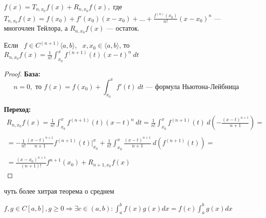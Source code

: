 \begin{reminder}
    $
    f(x) = T_{n, x_0} f(x) + R_{n, x_0} f(x),$
        где $T_{n, x_0} f(x) = f(x_0) + f'(x_0)(x - x_0) + \dots + \frac{f^{(n)}(x_0)}{n!}(x - x_0)^n
    $ --- многочлен Тейлора, а $R_{n, x_0} f(x)$ --- остаток.
\end{reminder}


\begin{theorem}

\quad

    Если \, $f \in C^{(n + 1)} \langle a, b \rangle$,  \, $x, x_0 \in \langle a, b \rangle$, то
    $
        R_{n, x_0}f(x) = \frac{1}{n!} \int_{x_0}^x f^{(n + 1)}(t)(x-t)^n\ dt
    $
\end{theorem}

\begin{proof}

    \textbf{\large База:} 
    \[
        n = 0, \text{ то } f(x) = f(x_0) + \int_{x_0}^{x}f'(t)\ dt  \text{ --- формула Ньютона-Лейбница}
    \]

    \textbf{\large Переход:} 
    \[
        \begin{gathered}
        R_{n, x_0}f(x) = \frac{1}{n!} \int_{x_0}^{x}f^{(n+1)}(t)(x - t)^n\ dt =
        \frac{1}{n!} \int_{x_0}^x f^{(n + 1)}(t)\ d\left(-\frac{(x - t) ^ {n + 1}}{n + 1}\right) =\\\\
        = - \frac{1}{n!} \frac{(x - t) ^ {n + 1}}{n + 1} f^{(n + 1)}(t) \bigg|_{x_0}^{x} +
        \frac{1}{n!} \int_{x_0}^{x} \frac{(x - t)^{n + 1}}{n + 1}\ d\left(f^{(n + 1)}(t)\right) =\\\\
        = \frac{(x - x_0) ^ {n + 1}}{(n + 1)!} f^{n + 1}(x_0) + R_{n + 1, x_0} f(x)
        \end{gathered}
    \]


\end{proof}


\begin{namedlemma}{чуть более хитрая теорема о среднем}
    
    $f, g \in C[a, b], g \geqslant 0 \Rightarrow \exists c \in (a, b) : \int_a^b f(x) g(x) dx = f(c) \int_a^b g(x) dx$
\end{namedlemma}

